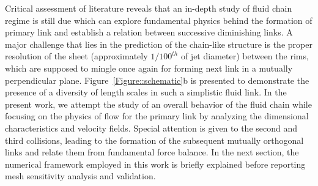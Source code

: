 \documentclass{jfm}
\begin{document}
Critical assessment of literature reveals that an in-depth study of fluid chain regime is still due which can explore fundamental physics behind the formation of primary link and establish a relation between successive diminishing links. A major challenge that lies in the prediction of the chain-like structure is the proper resolution of the sheet (approximately $1/100^{th}$ of jet diameter) between the rims, which are supposed to mingle once again for forming next link in a mutually perpendicular plane. Figure~\ref{Figure::schematic}b is presented to demonstrate the presence of a diversity of length scales in such a simplistic fluid link. In the present work, we attempt the study of an overall behavior of the fluid chain while focusing on the physics of flow for the primary link by analyzing the dimensional characteristics and velocity fields. Special attention is given to the second and third collisions, leading to the formation of the subsequent mutually orthogonal links and relate them from fundamental force balance. In the next section, the numerical framework employed in this work is briefly explained before reporting mesh sensitivity analysis and validation.
\end{document}
